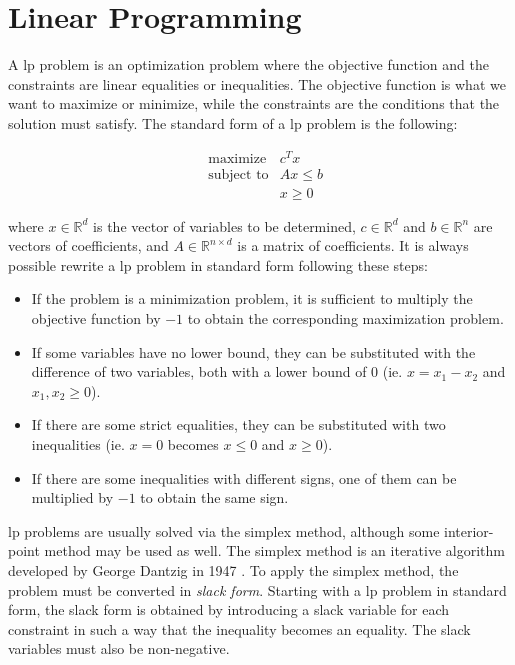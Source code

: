 

\section{Linear Programming}

A \gls{lp} problem is an optimization problem where the objective function and the constraints are linear equalities or inequalities.
The objective function is what we want to maximize or minimize, while the constraints are the conditions that the solution must satisfy.
The standard form of a \gls{lp} problem is the following:

\begin{equation*}
    \begin{aligned}
         & \text{maximize}   & c^T x      \\
         & \text{subject to} & A x \leq b \\
         &                   & x \geq 0
    \end{aligned}
\end{equation*}

where $x \in \mathbb{R}^d$ is the vector of variables to be determined, $c \in \mathbb{R}^d$ and $b \in \mathbb{R}^n$ are vectors of coefficients, and $A \in \mathbb{R}^{n \times d}$ is a matrix of coefficients.
It is always possible rewrite a \gls{lp} problem in standard form following these steps:
\begin{itemize}
    \item If the problem is a minimization problem, it is sufficient to multiply the objective function by $-1$ to obtain the corresponding maximization problem.
    \item If some variables have no lower bound, they can be substituted with the difference of two variables, both with a lower bound of $0$ (ie. $x = x_1 - x_2$ and $x_1, x_2 \geq 0$).
    \item If there are some strict equalities, they can be substituted with two inequalities (ie. $x = 0$ becomes $x \leq 0$ and $x \geq 0$).
    \item If there are some inequalities with different signs, one of them can be multiplied by $-1$ to obtain the same sign.
\end{itemize}

\gls{lp} problems are usually solved via the simplex method, although some interior-point method \cite{paper:interior-point} may be used as well.
The simplex method is an iterative algorithm developed by George Dantzig in 1947 \cite{paper:simplex}.
To apply the simplex method, the problem must be converted in \textit{slack form}.
Starting with a \gls{lp} problem in standard form, the slack form is obtained by introducing a slack variable for each constraint in such a way that the inequality becomes an equality.
The slack variables must also be non-negative.

